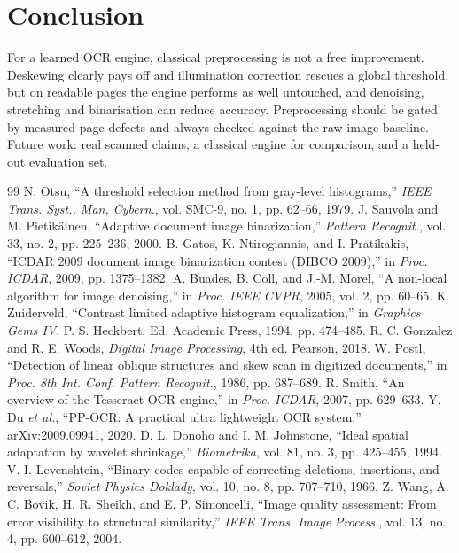 \documentclass[conference]{IEEEtran}
\begin{document}
\section{Conclusion}
For a learned OCR engine, classical preprocessing is not a free improvement. Deskewing clearly pays off and illumination correction rescues a global threshold, but on readable pages the engine performs as well untouched, and denoising, stretching and binarisation can reduce accuracy. Preprocessing should be gated by measured page defects and always checked against the raw-image baseline. Future work: real scanned claims, a classical engine for comparison, and a held-out evaluation set.

\begin{thebibliography}{99}
 N. Otsu, ``A threshold selection method from gray-level histograms,'' \emph{IEEE Trans. Syst., Man, Cybern.}, vol. SMC-9, no. 1, pp. 62--66, 1979.
 J. Sauvola and M. Pietik\"ainen, ``Adaptive document image binarization,'' \emph{Pattern Recognit.}, vol. 33, no. 2, pp. 225--236, 2000.
 B. Gatos, K. Ntirogiannis, and I. Pratikakis, ``ICDAR 2009 document image binarization contest (DIBCO 2009),'' in \emph{Proc. ICDAR}, 2009, pp. 1375--1382.
 A. Buades, B. Coll, and J.-M. Morel, ``A non-local algorithm for image denoising,'' in \emph{Proc. IEEE CVPR}, 2005, vol. 2, pp. 60--65.
 K. Zuiderveld, ``Contrast limited adaptive histogram equalization,'' in \emph{Graphics Gems IV}, P. S. Heckbert, Ed. Academic Press, 1994, pp. 474--485.
 R. C. Gonzalez and R. E. Woods, \emph{Digital Image Processing}, 4th ed. Pearson, 2018.
 W. Postl, ``Detection of linear oblique structures and skew scan in digitized documents,'' in \emph{Proc. 8th Int. Conf. Pattern Recognit.}, 1986, pp. 687--689.
 R. Smith, ``An overview of the Tesseract OCR engine,'' in \emph{Proc. ICDAR}, 2007, pp. 629--633.
 Y. Du \emph{et al.}, ``PP-OCR: A practical ultra lightweight OCR system,'' arXiv:2009.09941, 2020.
 D. L. Donoho and I. M. Johnstone, ``Ideal spatial adaptation by wavelet shrinkage,'' \emph{Biometrika}, vol. 81, no. 3, pp. 425--455, 1994.
 V. I. Levenshtein, ``Binary codes capable of correcting deletions, insertions, and reversals,'' \emph{Soviet Physics Doklady}, vol. 10, no. 8, pp. 707--710, 1966.
 Z. Wang, A. C. Bovik, H. R. Sheikh, and E. P. Simoncelli, ``Image quality assessment: From error visibility to structural similarity,'' \emph{IEEE Trans. Image Process.}, vol. 13, no. 4, pp. 600--612, 2004.
\end{thebibliography}
\end{document}

